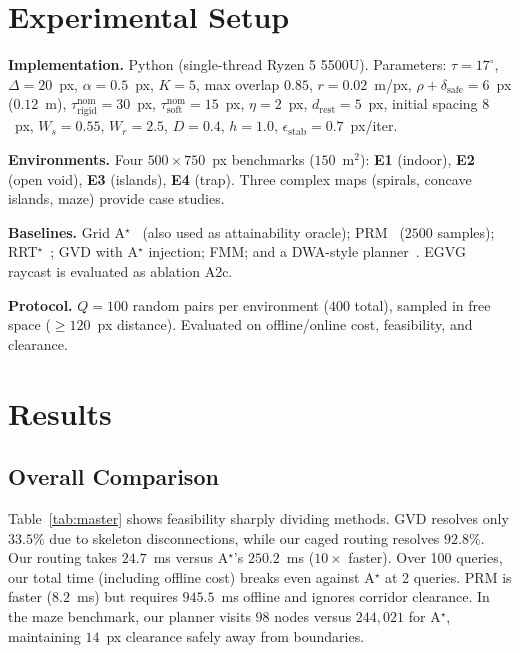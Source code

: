 \documentclass[conference]{IEEEtran}
\begin{document}
\section{Experimental Setup}
\label{sec:setup}

\textbf{Implementation.} Python (single-thread Ryzen 5 5500U). Parameters: $\tau=17^\circ$, $\Delta=20$~px, $\alpha=0.5$~px, $K=5$, max overlap $0.85$, $r=0.02$~m/px, $\rho+\delta_{\mathrm{safe}}=6$~px ($0.12$~m), $\tau^{\mathrm{nom}}_{\mathrm{rigid}}=30$~px, $\tau^{\mathrm{nom}}_{\mathrm{soft}}=15$~px, $\eta=2$~px, $d_{\mathrm{rest}}=5$~px, initial spacing $8$~px, $W_s=0.55$, $W_r=2.5$, $D=0.4$, $h=1.0$, $\epsilon_{\mathrm{stab}}=0.7$~px/iter.

\textbf{Environments.} Four $500\times750$~px benchmarks ($150$~m$^2$): \textbf{E1} (indoor), \textbf{E2} (open void), \textbf{E3} (islands), \textbf{E4} (trap). Three complex maps (spirals, concave islands, maze) provide case studies.

\textbf{Baselines.} Grid A$^\star$~\cite{hart1968} (also used as attainability oracle); PRM~\cite{kavraki1996} ($2500$ samples); RRT$^\star$~\cite{karaman2011}; GVD with A$^\star$ injection; FMM; and a DWA-style planner~\cite{fox1997}. EGVG raycast is evaluated as ablation A2c.

\textbf{Protocol.} $Q=100$ random pairs per environment ($400$ total), sampled in free space ($\ge 120$~px distance). Evaluated on offline/online cost, feasibility, and clearance.

\section{Results}
\label{sec:results}

\subsection{Overall Comparison}

Table~\ref{tab:master} shows feasibility sharply dividing methods. GVD resolves only $33.5\%$ due to skeleton disconnections, while our caged routing resolves $92.8\%$. Our routing takes $24.7$~ms versus A$^\star$'s $250.2$~ms ($10\times$ faster). Over 100 queries, our total time (including offline cost) breaks even against A$^\star$ at 2 queries. PRM is faster ($8.2$~ms) but requires $945.5$~ms offline and ignores corridor clearance. In the maze benchmark, our planner visits $98$ nodes versus $244{,}021$ for A$^\star$, maintaining $14$~px clearance safely away from boundaries.
\end{document}
